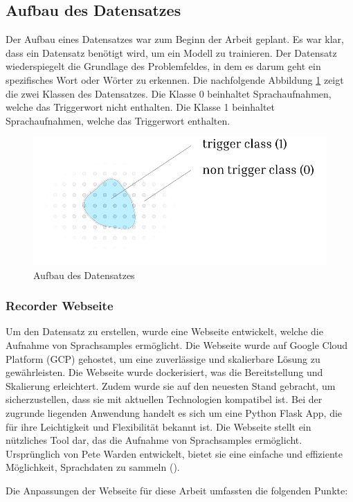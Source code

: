 \documentclass[11pt,a4paper]{article}
\begin{document}
\subsection{Aufbau des Datensatzes}
Der Aufbau eines Datensatzes war zum Beginn der Arbeit geplant. Es war klar, dass ein Datensatz 
benötigt wird, um ein Modell zu trainieren. Der Datensatz wiederspiegelt die Grundlage des 
Problemfeldes, in dem es darum geht ein spezifisches Wort oder Wörter zu erkennen. Die nachfolgende 
Abbildung \ref{fig:dataset} zeigt die zwei Klassen des Datensatzes. Die Klasse 0 beinhaltet 
Sprachaufnahmen, welche das Triggerwort nicht enthalten. Die Klasse 1 beinhaltet Sprachaufnahmen, 
welche das Triggerwort enthalten.

\hspace*{-1.5cm}
\begin{figure}[h]
	\centering
	\includegraphics[width=0.75\linewidth]{img/dataset.pdf}
	\caption{Aufbau des Datensatzes}
	\label{fig:dataset} 
\end{figure}

\subsubsection{Recorder Webseite}
Um den Datensatz zu erstellen, wurde eine Webseite entwickelt, welche die Aufnahme von Sprachsamples 
ermöglicht. Die Webseite wurde auf Google Cloud Platform (GCP) gehostet, um eine zuverlässige und
skalierbare Lösung zu gewährleisten. Die Webseite wurde dockerisiert, was die Bereitstellung und 
Skalierung erleichtert. Zudem wurde sie auf den neuesten Stand gebracht, um sicherzustellen, dass 
sie mit aktuellen Technologien kompatibel ist. Bei der zugrunde liegenden Anwendung handelt es sich 
um eine Python Flask App, die für ihre Leichtigkeit und Flexibilität bekannt ist. Die Webseite 
stellt ein nützliches Tool dar, das die Aufnahme von Sprachsamples ermöglicht. Ursprünglich von 
Pete Warden entwickelt, bietet sie eine einfache und effiziente Möglichkeit, Sprachdaten zu sammeln 
(\cite{warden2018speech}).

\noindent \newline
Die Anpassungen der Webseite für diese Arbeit umfassten die folgenden Punkte:
\end{document}
